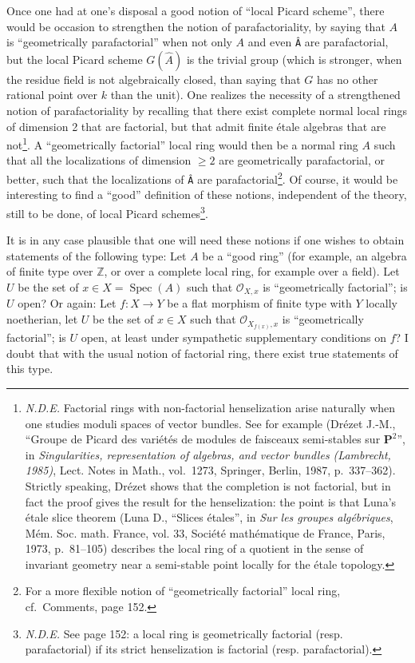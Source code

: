 \documentclass[
  11pt,
  a4paper,
]{book}
\begin{document}
Once one had at one's disposal a good notion of ``local Picard scheme'',
there would be occasion to strengthen the notion of parafactoriality, by
saying that \(A\) is ``geometrically parafactorial'' when not only \(A\)
and even \texttt{Â} are parafactorial, but the local Picard scheme
\(G(\hat{A})\) is the trivial group (which is stronger, when the residue
field is not algebraically closed, than saying that \(G\) has no other
rational point over \(k\) than the unit). One realizes the necessity of
a strengthened notion of parafactoriality by recalling that there exist
complete normal local rings of dimension 2 that are factorial, but that
admit finite étale algebras that are not\footnote{\emph{N.D.E.}
  Factorial rings with non-factorial henselization arise naturally when
  one studies moduli spaces of vector bundles. See for example (Drézet
  J.-M., ``Groupe de Picard des variétés de modules de faisceaux
  semi-stables sur \(\mathbf{P}^{2}\)'', in \emph{Singularities,
  representation of algebras, and vector bundles (Lambrecht, 1985)},
  Lect. Notes in Math., vol.~1273, Springer, Berlin, 1987, p.~337--362).
  Strictly speaking, Drézet shows that the completion is not factorial,
  but in fact the proof gives the result for the henselization: the
  point is that Luna's étale slice theorem (Luna D., ``Slices étales'',
  in \emph{Sur les groupes algébriques}, Mém. Soc. math. France, vol.
  33, Société mathématique de France, Paris, 1973, p.~81--105) describes
  the local ring of a quotient in the sense of invariant geometry near a
  semi-stable point locally for the étale topology.}. A ``geometrically
factorial'' local ring would then be a normal ring \(A\) such that all
the localizations of dimension \(\geqslant 2\) are geometrically
parafactorial, or better, such that the localizations of \texttt{Â} are
parafactorial\footnote{For a more flexible notion of ``geometrically
  factorial'' local ring, cf.~Comments, page 152.}. Of course, it would
be interesting to find a ``good'' definition of these notions,
independent of the theory, still to be done, of local Picard
schemes\footnote{\emph{N.D.E.} See page 152: a local ring is
  geometrically factorial (resp. parafactorial) if its strict
  henselization is factorial (resp. parafactorial).}.

It is in any case plausible that one will need these notions if one
wishes to obtain statements of the following type: Let \(A\) be a ``good
ring'' (for example, an algebra of finite type over \(\mathbb{Z}\), or
over a complete local ring, for example over a field). Let \(U\) be the
set of \(x \in X = \operatorname{Spec}(A)\) such that
\(\mathcal{O}_{X,x}\) is ``geometrically factorial''; is \(U\) open? Or
again: Let \(f : X \to Y\) be a flat morphism of finite type with \(Y\)
locally noetherian, let \(U\) be the set of \(x \in X\) such that
\(\mathcal{O}_{X_{f(x)},x}\) is ``geometrically factorial''; is \(U\)
open, at least under sympathetic supplementary conditions on \(f\)? I
doubt that with the usual notion of factorial ring, there exist true
statements of this type.
\end{document}
